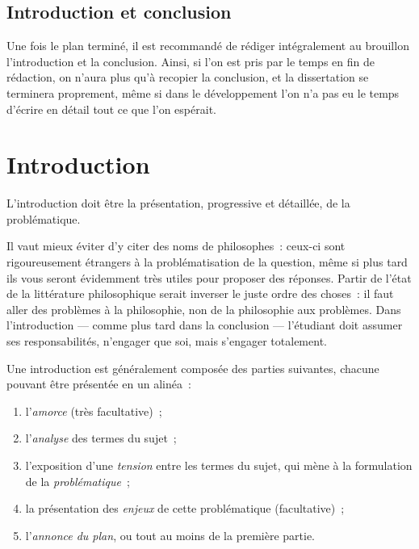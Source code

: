 \documentclass[a4paper,11pt]{article}
\begin{document}
\par

\subsection{Introduction et conclusion}

Une fois le plan terminé, il est recommandé de rédiger intégralement au
brouillon l'introduction et la conclusion. Ainsi, si l'on est pris par
le temps en fin de rédaction, on n'aura plus qu'à recopier la
conclusion, et la dissertation se terminera proprement, même si dans le
développement l'on n'a pas eu le temps d'écrire en détail tout ce que
l'on espérait.




\section{Introduction}

L'introduction doit être la présentation, progressive et détaillée, de
la problématique.

\par

Il vaut mieux éviter d'y citer des noms de philosophes~: ceux-ci sont
rigoureusement étrangers à la problématisation de la question, même si
plus tard ils vous seront évidemment très utiles pour proposer des
réponses. Partir de l'état de la littérature philosophique serait
inverser le juste ordre des choses~: il faut aller des problèmes à la
philosophie, non de la philosophie aux problèmes. Dans l'introduction
--- comme plus tard dans la conclusion --- l'étudiant doit assumer ses
responsabilités, n'engager que soi, mais s'engager totalement.

\par

Une introduction est généralement composée des parties suivantes,
chacune pouvant être présentée en un alinéa~:
\begin{enumerate}
\item l'\emph{amorce} (très facultative)~;
\item l'\emph{analyse} des termes du sujet~;
\item l'exposition d'une \emph{tension} entre les termes du sujet, qui
  mène à la formulation de la \emph{problématique}~;
\item la présentation des \emph{enjeux} de cette problématique
  (facultative)~;
\item l'\emph{annonce du plan}, ou tout au moins de la première partie.
\end{enumerate}
\end{document}
